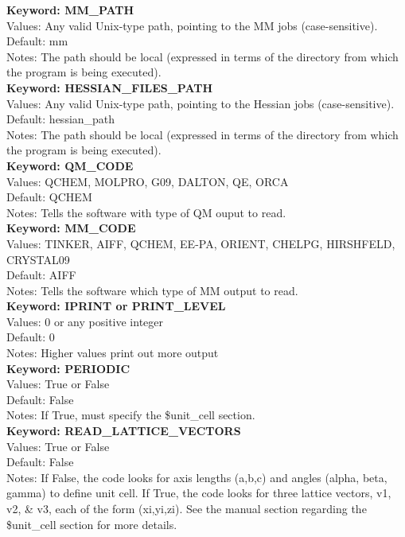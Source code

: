 \documentclass[11pt,letterpaper]{article}
\begin{document}
\begin{spacing}{1.0}
\noindent
\textbf{Keyword: MM\_PATH} \\
Values:  Any valid Unix-type path, pointing to the MM jobs 
	 (case-sensitive). \\
Default: mm\\
Notes:   The path should be local (expressed in terms of the directory from
	 which the program is being executed). \\

\noindent
\textbf{Keyword:  HESSIAN\_FILES\_PATH} \\
Values:  Any valid Unix-type path, pointing to the Hessian jobs 
	 (case-sensitive). \\
Default: hessian\_path\\
Notes:   The path should be local (expressed in terms of the directory from
	 which the program is being executed). \\

\noindent
\textbf{Keyword: QM\_CODE}\\
Values: QCHEM, MOLPRO, G09, DALTON, QE, ORCA\\
Default: QCHEM\\
Notes:    Tells the software with type of QM ouput to read.\\

\noindent
\textbf{Keyword:  MM\_CODE} \\
Values:  TINKER, AIFF, QCHEM, EE-PA, ORIENT, CHELPG, HIRSHFELD, CRYSTAL09 \\
Default: AIFF\\
Notes:   Tells the software which type of MM output to read. \\

\noindent
\textbf{Keyword: IPRINT or PRINT\_LEVEL} \\
Values:  0 or any positive integer \\
Default: 0 \\
Notes:   Higher values print out more output \\

\noindent
\textbf{Keyword: PERIODIC} \\
Values:  True or False  \\
Default: False \\
Notes:   If True, must specify the \$unit\_cell section. \\

\noindent
\textbf{Keyword: READ\_LATTICE\_VECTORS} \\
Values:  True or False \\
Default: False \\
Notes:   If False, the code looks for axis lengths (a,b,c) and angles
         (alpha, beta, gamma) to define unit cell.  If True, the code
         looks for three lattice vectors, v1, v2, \& v3, each of the form
         (xi,yi,zi).  See the manual section regarding the \$unit\_cell
	 section for more details. \\


\end{spacing}
\end{document}
